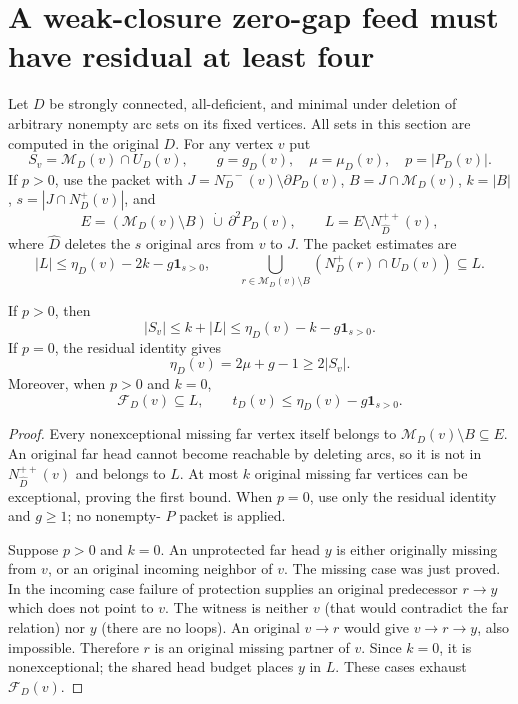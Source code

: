 \section{A weak-closure zero-gap feed must have residual at least four}
\label{sec:minimal-weak-zero-feed-residual-budget}

Let $D$ be strongly connected, all-deficient, and minimal under deletion
of arbitrary nonempty arc sets on its fixed vertices. All sets in this
section are computed in the original $D$. For any vertex $v$ put
\[
 S_v=\mathcal M_D(v)\cap U_D(v),\qquad
 g=g_D(v),\quad\mu=\mu_D(v),\quad p=|P_D(v)|.
\]
If $p>0$, use the packet with
$J=N_D^{--}(v)\setminus\partial P_D(v)$,
$B=J\cap\mathcal M_D(v)$, $k=|B|$,
$s=|J\cap N_D^+(v)|$, and
\[
 E=(\mathcal M_D(v)\setminus B)\,\dot\cup\,\partial^2P_D(v),
 \qquad L=E\setminus N_{\widehat D}^{++}(v),
\]
where $\widehat D$ deletes the $s$ original arcs from $v$ to $J$.
The packet estimates are
\[
 |L|\le\eta_D(v)-2k-g\mathbf1_{s>0},\qquad
 \bigcup_{r\in\mathcal M_D(v)\setminus B}
       (N_D^+(r)\cap U_D(v))\subseteq L.
\]

\begin{lemma}
\label{lem:minimal-missing-far-packet-budget}
If $p>0$, then
\[
 |S_v|\le k+|L|
       \le\eta_D(v)-k-g\mathbf1_{s>0}.
\]
If $p=0$, the residual identity gives
\[
 \eta_D(v)=2\mu+g-1\ge2|S_v|.
\]
Moreover, when $p>0$ and $k=0$,
\[
 \mathcal F_D(v)\subseteq L,
 \qquad t_D(v)\le\eta_D(v)-g\mathbf1_{s>0}.
\]
\end{lemma}
\begin{proof}
Every nonexceptional missing far vertex itself belongs to
$\mathcal M_D(v)\setminus B\subseteq E$. An original far head cannot
become reachable by deleting arcs, so it is not in
$N_{\widehat D}^{++}(v)$ and belongs to $L$. At most $k$ original
missing far vertices can be exceptional, proving the first bound.
When $p=0$, use only the residual identity and $g\ge1$; no nonempty-
$P$ packet is applied.

Suppose $p>0$ and $k=0$. An unprotected far head $y$ is either
originally missing from $v$, or an original incoming neighbor of $v$.
The missing case was just proved. In the incoming case failure of
protection supplies an original predecessor $r\to y$ which does not
point to $v$. The witness is neither $v$ (that would contradict the
far relation) nor $y$ (there are no loops). An original $v\to r$
would give $v\to r\to y$, also impossible. Therefore $r$ is an
original missing partner of $v$. Since $k=0$, it is nonexceptional;
the shared head budget places $y$ in $L$. These cases exhaust
$\mathcal F_D(v)$.
\end{proof}

